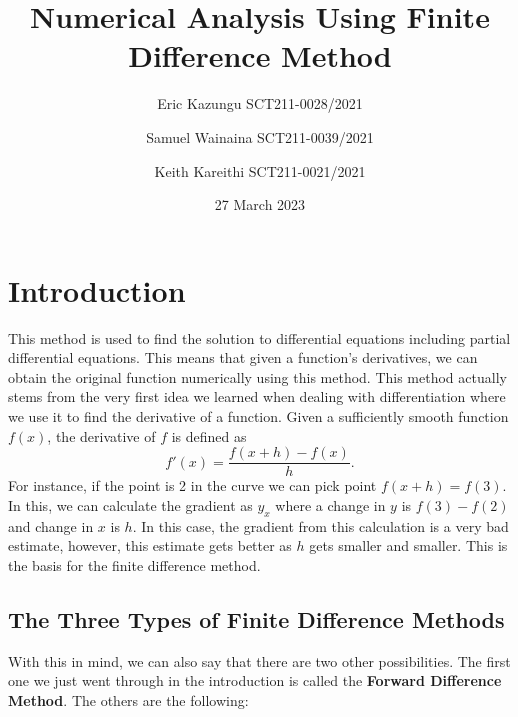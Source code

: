 \documentclass{article}
\title{Numerical Analysis Using Finite Difference Method}
\author{Eric Kazungu  SCT211-0028/2021 \and Samuel Wainaina  SCT211-0039/2021 \and Keith Kareithi  SCT211-0021/2021}
\date{27 March 2023}
\begin{document}
\maketitle
\section*{Introduction}
This method is used to find the solution to differential equations including partial differential equations. This means that given a function's derivatives, we can obtain the original function numerically using this method. This method actually stems from the very first idea we learned when dealing with differentiation where we use it to find the derivative of a function. Given a sufficiently smooth function $f(x)$, the derivative of $f$ is defined as
\begin{equation*}
    f'(x)=\frac{f(x+h)-f(x)}{h}.
\end{equation*}
For instance, if the point is 2 in the curve we can pick point $f(x+h)=f(3)$. In this, we can calculate the gradient as $y_x$ where a change in $y$ is $f(3)-f(2)$ and change in $x$ is $h$. In this case, the gradient from this calculation is a very bad estimate, however, this estimate gets better as $h$ gets smaller and smaller. This is the basis for the finite difference method.

\subsection*{The Three Types of Finite Difference Methods}

With this in mind, we can also say that there are two other possibilities. The first one we just went through in the introduction is called the \textbf{Forward Difference Method}. The others are the following:
\end{document}
